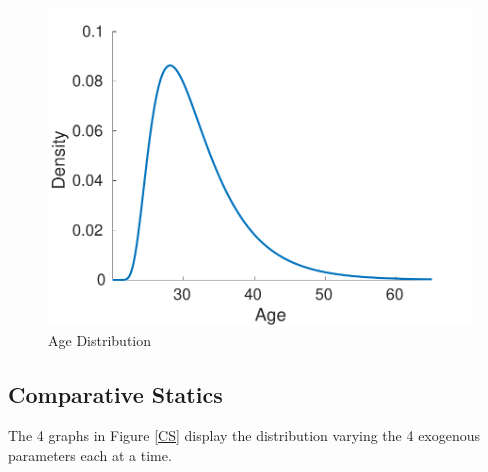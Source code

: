 \documentclass[11pt]{article}
\theoremstyle{definition} %
\begin{document}
\begin{figure}[h!]
\centering
\caption{Age Distribution} \label{age_dist}
\vspace{3mm}
\includegraphics[scale=0.6]{fthb_age_dist.pdf}
\end{figure}
\subsection{Comparative Statics}
The 4 graphs in Figure \ref{CS} display the distribution varying the 4 exogenous parameters each at a time.
\end{document}
